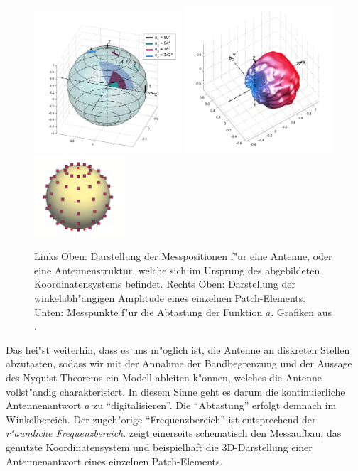 \begin{figure}[t]
    \centering\includegraphics[width=0.49\textwidth]{img/eadf/measure.png}
    \includegraphics[width=0.49\textwidth]{img/eadf/3d_bp.png}
    \includegraphics[width=0.3\textwidth]{img/eadf/bp_sampling.png}
    \caption{Links Oben: Darstellung der Messpositionen f"ur eine Antenne, oder eine Antennenstruktur, welche sich im Ursprung des abgebildeten Koordinatensystems befindet. Rechts Oben: Darstellung der winkelabh"angigen Amplitude eines einzelnen Patch-Elements. Unten: Messpunkte f"ur die Abtastung der Funktion $a$. Grafiken aus \cite{landmann2004EADF,delgaldo2007phd}.}\label{fig:eadf:meas}
\end{figure}

Das hei"st weiterhin, dass es uns m"oglich ist, die Antenne an diskreten Stellen abzutasten, sodass wir mit der Annahme der Bandbegrenzung und der Aussage des Nyquist-Theorems ein Modell ableiten k"onnen, welches die Antenne vollst"andig charakterisiert.
In diesem Sinne geht es darum die kontinuierliche Antennenantwort $a$ zu ``digitalisieren''.
Die ``Abtastung'' erfolgt demnach im Winkelbereich. Der zugeh"orige ``Frequenzbereich'' ist entsprechend der \emph{r"aumliche Frequenzbereich}.
 zeigt einerseits schematisch den Messaufbau, das genutzte Koordinatensystem und beispielhaft die 3D-Darstellung einer Antennenantwort eines einzelnen Patch-Elements.

